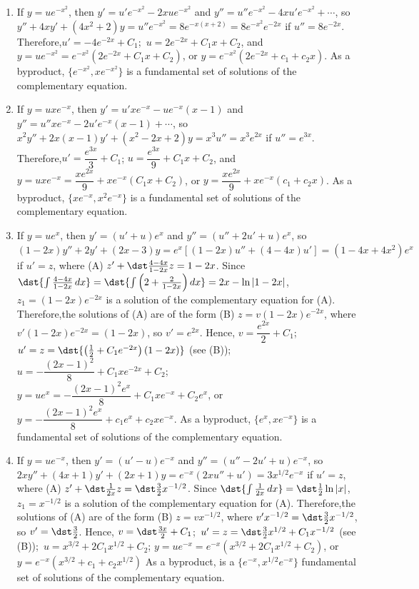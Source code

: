 \documentclass[openany]{book}
\newenvironment{sectionSolutions}{
 \begin{enumerate}[item-label={\thesection.\arabic{enumi}.}]
}{
 \end{enumerate}
}
\begin{document}
\begin{sectionSolutions}
\item
If $y=ue^{-x^2}$, then $y'=u'e^{-x^2}-2xue^{-x^2}$ and
$y''=u''e^{-x^2}-4x u'e^{-x^2}+\cdots$, so
$y''+4xy'+(4x^2+2)y=u''e^{-x^2}=8e^{-x(x+2)}=8e^{-x^2}e^{-2x}$ if
$u''=8e^{-2x}$. Therefore,$u'=-4e^{-2x}+C_1$;\ $u=2e^{-2x}+C_1x+C_2$,
and $y=ue^{-x^2}=e^{-x^2}(2e^{-2x}+C_1x+C_2)$, or
$y=e^{-x^2}(2e^{-2x}+c_1+c_2x)$. As a byproduct,
$\{e^{-x^2},xe^{-x^2}\}$ is a fundamental set of solutions of the
complementary equation.


\item
If $y=uxe^{-x}$, then $y'=u'x e^{-x}-ue^{-x}(x-1)$ and
$y''=u''xe^{-x}-2u'e^{-x}(x-1)+\cdots$, so
$x^2y''+2x(x-1)y'+(x^2-2x+2)y=x^3u''=x^3e^{2x}$ if $u''=e^{3x}$.
Therefore,$u'=\dfrac{e^{3x}}{3}+C_1$;\;
$u=\dfrac{e^{3x}}{9}+C_1x+C_2$, and
$y=uxe^{-x}=\dfrac{xe^{2x}}{9}+xe^{-x}(C_1x+C_2)$, or
$y=\dfrac{xe^{2x}}{9}+xe^{-x}(c_1+c_2x)$. As a byproduct,
$\{xe^{-x},x^2e^{-x}\}$ is a fundamental set of solutions of the
complementary equation.


\item
If $y=ue^x$, then $y'=(u'+u)e^x$ and $y''=(u''+2u'+u)e^x$, so
$(1-2x)y''+2y'+(2x-3)y=e^x\left[(1-2x)u''+(4-4x)u'\right]=(1-4x+4x^2)e^x$
if $u'=z$, where (A) $z'+\dst\frac{4-4x}{1-2x}z=1-2x$. Since
$\dst{\int\frac{4-4x}{1-2x}\,dx}=
\dst{\int{\left(2+\frac{2}{1-2x}\right)}\,dx}=2x-\ln|1-2x|$,
$z_1=(1-2x)e^{-2x}$ is a solution of the complementary equation for
(A). Therefore,the solutions of (A) are of the form (B)
$z=v(1-2x)e^{-2x}$, where $v'(1-2x)e^{-2x}=(1-2x)$, so $v'=e^{2x}$.
Hence, $v=\dfrac{e^{2x}}{2}+C_1$;\;
$u'=z=\dst{\left(\frac{1}{2}+C_1e^{-2x}\right)(1-2x)}$ (see (B));\;
$u=-\dfrac{(2x-1)^2}{8}+C_1xe^{-2x}+C_2$;\;
$y=ue^x=-\dfrac{(2x-1)^2e^x}{8}+C_1xe^{-x}+C_2e^x$, or
$y=-\dfrac{(2x-1)^2e^x}{8}+c_1e^x+c_2xe^{-x}$. As a byproduct,
$\{e^x,xe^{-x}\}$ is a fundamental set of solutions of the
complementary equation.


\item
If $y=ue^{-x}$, then $y'=(u'-u)e^{-x}$ and $y''=(u''-2u'+u)e^{-x}$, so
$2xy''+(4x+1)y'+(2x+1)y=e^{-x}(2xu''+u')=3x^{1/2}e^{-x}$ if $u'=z$,
where (A) $z'+\dst\frac{1}{2x}z=\dst\frac{3}{2}x^{-1/2}$. Since $\dst{\int
\frac{1}{2x}\,dx}=\dst\frac{1}{2}\ln|x|$, $z_1=x^{-1/2}$ is a solution of
the complementary equation for (A). Therefore,the solutions of (A) are
of the form (B) $z=vx^{-1/2}$, where
$v'x^{-1/2}=\dst\frac{3}{2}x^{-1/2}$, so $v'=\dst\frac{3}{2}$. Hence,
$v=\dst\frac{3x}{2}+C_1$;\ $u'=z=\dst\frac{3}{2}x^{1/2}+C_1x^{-1/2}$ (see
(B));\ $u=x^{3/2}+2C_1x^{1/2}+C_2$;\;
$y=ue^{-x}=e^{-x}(x^{3/2}+2C_1x^{1/2}+C_2)$, or
$y=e^{-x}(x^{3/2}+c_1+c_2x^{1/2})$ As a byproduct, is a
$\{e^{-x},x^{1/2}e^{-x}\}$ fundamental set of solutions of the
complementary equation.



\end{sectionSolutions}
\end{document}
